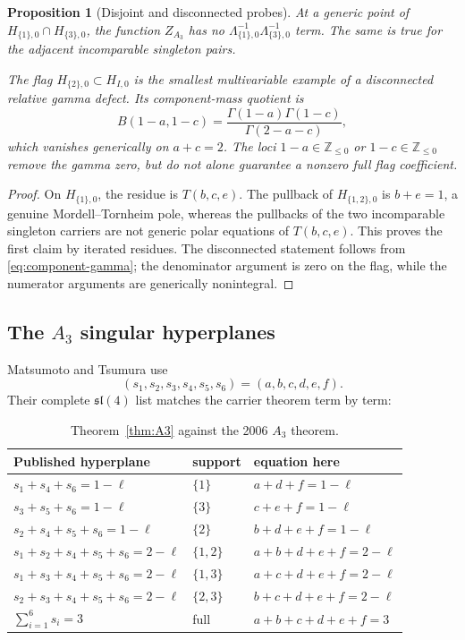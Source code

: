 \documentclass[11pt]{article}
\newtheorem{proposition}[theorem]{Proposition}
\begin{document}
\begin{proposition}[Disjoint and disconnected probes]
\label{prop:A3-probes}
At a generic point of
\(H_{\{1\},0}\cap H_{\{3\},0}\), the function \(Z_{A_3}\) has no
\(\Lambda_{\{1\},0}^{-1}\Lambda_{\{3\},0}^{-1}\) term.  The same is
true for the adjacent incomparable singleton pairs.

The flag \(H_{\{2\},0}\subset H_{I,0}\) is the smallest
multivariable example of a disconnected relative gamma defect.  Its
component-mass quotient is
\[
 B(1-a,1-c)=
 \frac{\Gamma(1-a)\Gamma(1-c)}{\Gamma(2-a-c)},
\]
which vanishes generically on \(a+c=2\).  The loci
\(1-a\in\mathbb Z_{\le0}\) or \(1-c\in\mathbb Z_{\le0}\) remove the
gamma zero, but do not alone guarantee a nonzero full flag coefficient.
\end{proposition}

\begin{proof}
On \(H_{\{1\},0}\), the residue is \(T(b,c,e)\).  The pullback of
\(H_{\{1,2\},0}\) is \(b+e=1\), a genuine Mordell--Tornheim pole,
whereas the pullbacks of the two incomparable singleton carriers are
not generic polar equations of \(T(b,c,e)\).  This proves the first
claim by iterated residues.  The disconnected statement follows from
\eqref{eq:component-gamma}; the denominator argument is zero on the
flag, while the numerator arguments are generically nonintegral.
\end{proof}


\subsection{The \texorpdfstring{\(A_3\)}{A3} singular hyperplanes}

Matsumoto and Tsumura use
\[
 (s_1,s_2,s_3,s_4,s_5,s_6)=(a,b,c,d,e,f).
\]
Their complete \(\mathfrak{sl}(4)\) list matches the carrier theorem
term by term:
\begin{table}[ht]
\centering
\small
\begin{tabular}{@{}lll@{}}
\toprule
Published hyperplane & support & equation here\\
\midrule
\(s_1+s_4+s_6=1-\ell\) & \(\{1\}\) & \(a+d+f=1-\ell\)\\
\(s_3+s_5+s_6=1-\ell\) & \(\{3\}\) & \(c+e+f=1-\ell\)\\
\(s_2+s_4+s_5+s_6=1-\ell\) & \(\{2\}\) & \(b+d+e+f=1-\ell\)\\
\(s_1+s_2+s_4+s_5+s_6=2-\ell\) & \(\{1,2\}\) &
 \(a+b+d+e+f=2-\ell\)\\
\(s_1+s_3+s_4+s_5+s_6=2-\ell\) & \(\{1,3\}\) &
 \(a+c+d+e+f=2-\ell\)\\
\(s_2+s_3+s_4+s_5+s_6=2-\ell\) & \(\{2,3\}\) &
 \(b+c+d+e+f=2-\ell\)\\
\(\sum_{i=1}^6s_i=3\) & full & \(a+b+c+d+e+f=3\)\\
\bottomrule
\end{tabular}
\caption{Theorem~\ref{thm:A3} against the 2006 \(A_3\) theorem.}
\label{tab:A3-comparison}
\end{table}
\end{document}
